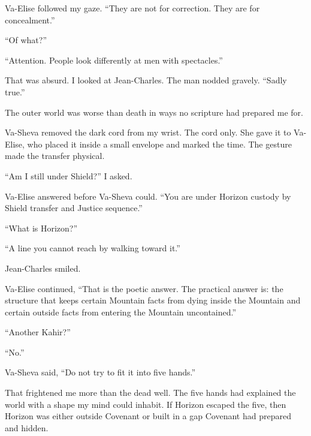 Va-Elise followed my gaze. ``They are not for correction. They are for concealment.''\par

``Of what?''\par

``Attention. People look differently at men with spectacles.''\par

That was absurd. I looked at Jean-Charles. The man nodded gravely. ``Sadly true.''\par

The outer world was worse than death in ways no scripture had prepared me for.\par

Va-Sheva removed the dark cord from my wrist. The cord only. She gave it to Va-Elise, who placed it inside a small envelope and marked the time. The gesture made the transfer physical.\par

``Am I still under Shield?'' I asked.\par

Va-Elise answered before Va-Sheva could. ``You are under Horizon custody by Shield transfer and Justice sequence.''\par

``What is Horizon?''\par

``A line you cannot reach by walking toward it.''\par

Jean-Charles smiled.\par

Va-Elise continued, ``That is the poetic answer. The practical answer is: the structure that keeps certain Mountain facts from dying inside the Mountain and certain outside facts from entering the Mountain uncontained.''\par

``Another Kahir?''\par

``No.''\par

Va-Sheva said, ``Do not try to fit it into five hands.''\par

That frightened me more than the dead well. The five hands had explained the world with a shape my mind could inhabit. If Horizon escaped the five, then Horizon was either outside Covenant or built in a gap Covenant had prepared and hidden.\par

